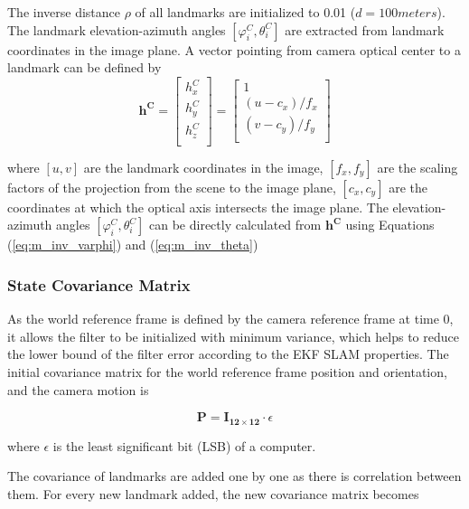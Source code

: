 The inverse distance $\rho$ of all landmarks are initialized to 0.01
($d=100 meters$). The landmark elevation-azimuth angles $[\varphi _{i}^{C},
\theta _{i}^{C}]$ are extracted from landmark coordinates in the image
plane. A vector pointing from camera optical center to a landmark
can be defined by
\begin{equation}
\label{eq:init_landmark_unit_vec}
\boldsymbol{h^{C}}=\begin{bmatrix}
h_{x}^{C}\\
h_{y}^{C}\\
h_{z}^{C}\\
\end{bmatrix}
 = \begin{bmatrix}
1 \\
(u-c_x)/f_{x} \\
(v-c_y)/f_{y} \\
\end{bmatrix}
\end{equation}

\noindent where $[u, v]$ are the landmark coordinates in the image, $
[f_{x}, f_{y}]$ are the scaling factors of the projection from the scene
to the image plane, $[c_x, c_y]$ are the coordinates at which the optical axis
intersects the image plane. The elevation-azimuth angles $[\varphi
_{i}^{C}, \theta _{i}^{C}]$ can be directly calculated from
$\boldsymbol{h^{C}}$ using Equations (\ref{eq:m_inv_varphi}) and (\ref{eq:m_inv_theta})

\subsubsection{State Covariance Matrix}

As the world reference frame is defined by the camera reference frame
at time 0, it allows the filter to be initialized with minimum
variance, which helps to reduce the lower bound of the filter error
according to the EKF SLAM properties. The initial covariance matrix for the
world reference frame position and orientation, and the camera motion is

\begin{equation}
\label{eq:Pinit}
\boldsymbol{P}=\boldsymbol{I_{12\times 12}}\cdot \epsilon 
\end{equation}

\noindent where $\epsilon $ is the least significant bit (LSB) of a
computer.

The covariance of landmarks are added one by one as there is 
correlation between them. For every new landmark added, the new 
covariance matrix becomes

